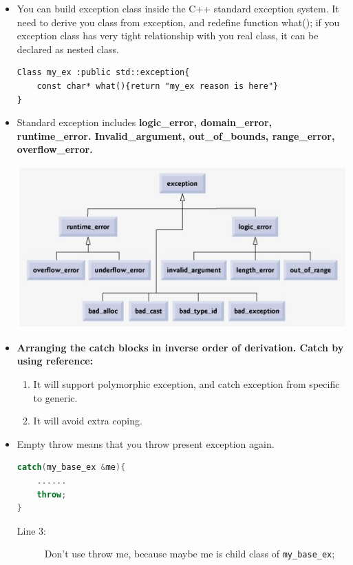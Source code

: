\documentclass[a4paper,11pt,twoside]{book}
\begin{document}
\begin{itemize}
	\item You can build exception class inside the C++ standard exception system. It need to derive you class from exception, and redefine function what();  if you exception class has very tight relationship with you real class, it can be declared as nested class.
	
\begin{lstlisting}[numbers=none]
Class my_ex :public std::exception{
	const char* what(){return "my_ex reason is here"}
}
\end{lstlisting}
	
	
	\item Standard exception includes \textbf{logic\_error, domain\_error,  runtime\_error.  Invalid\_argument, out\_of\_bounds, range\_error, overflow\_error.}
	
	\begin{center}
			\includegraphics[scale=0.8]{pics/exception.jpg}
	\end{center}

	\item \textbf{Arranging the catch blocks in inverse order of derivation. Catch by using reference:}
	\begin{enumerate}
		\item It will support polymorphic exception, and catch exception from specific to generic.
		\item It will avoid extra coping.
	\end{enumerate}
	
\item Empty throw means that you throw present exception again.
\begin{lstlisting}[frame=single, language=c++]
catch(my_base_ex &me){
	......
	throw;
}
\end{lstlisting}
\begin{description}
	\item[Line 3:] Don't use throw me, because maybe me is child class of \texttt{my\_base\_ex};
\end{description}


\end{itemize}
\end{document}

